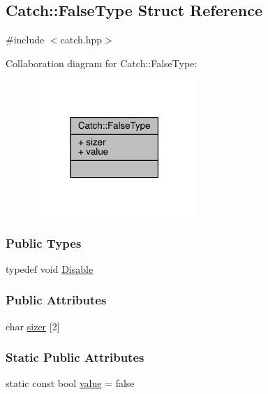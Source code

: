 \hypertarget{a00029}{}\subsection{Catch\+:\+:False\+Type Struct Reference}
\label{a00029}


{\ttfamily \#include $<$catch.\+hpp$>$}



Collaboration diagram for Catch\+:\+:False\+Type\+:\nopagebreak
\begin{figure}[H]
\begin{center}
\leavevmode
\includegraphics[width=174pt]{a00191}
\end{center}
\end{figure}
\subsubsection*{Public Types}
\begin{DoxyCompactItemize}
\item 
typedef void \hyperlink{a00029_a9b1d652f081c774bdaea5d061bb3372c}{Disable}
\end{DoxyCompactItemize}
\subsubsection*{Public Attributes}
\begin{DoxyCompactItemize}
\item 
char \hyperlink{a00029_ad0a0468edb767e93e12459b816a89a88}{sizer} \mbox{[}2\mbox{]}
\end{DoxyCompactItemize}
\subsubsection*{Static Public Attributes}
\begin{DoxyCompactItemize}
\item 
static const bool \hyperlink{a00029_a34974ab2e06c898a360ba5f3b2d9ebe3}{value} = false
\end{DoxyCompactItemize}


